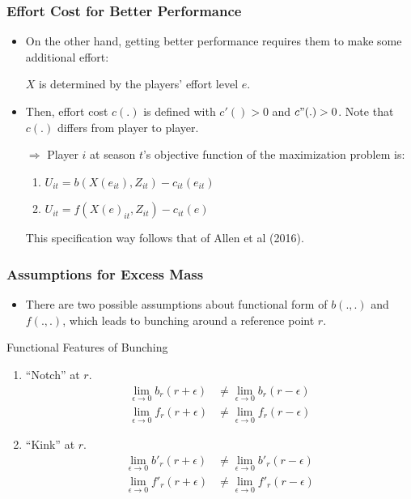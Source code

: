 \documentclass[dvipdfmx,12pt]{beamer}
\begin{document}
\begin{frame}\frametitle{Effort Cost for Better Performance}
  \begin{itemize}
    \item On the other hand, getting better performance requires them to make some additional effort:

    $X$ is determined by the players' effort level $e$.

    \item Then, effort cost $c(.)$ is defined with $c'() > 0$ and $c"(.) >0$. Note that $c(.)$ differs from player to player.

    $\Rightarrow$ Player $i$ at season $t$'s objective function of the maximization problem is:

    \begin{enumerate}
      \item $U_{it} = b(X(e_{it}), Z_{it}) - c_{it}(e_{it})$

      \item $U_{it} = f(X(e)_{it}, Z_{it}) - c_{it}(e)$
    \end{enumerate}

    This specification way follows that of Allen et al (2016).
  \end{itemize}
\end{frame}

\begin{frame}\frametitle{Assumptions for Excess Mass}
  \begin{itemize}
    \item There are two possible assumptions about functional form of $b(.,.)$ and $f(.,.)$, which leads to bunching around a reference point $r$.

  \end{itemize}

  \begin{block}{Functional Features of Bunching}
    \begin{enumerate}
      \footnotesize
      \item ``Notch'' at $r$.
      \begin{align*}
        \lim_{\epsilon \to 0} b_r (r + \epsilon) & \neq
        \lim_{\epsilon \to 0} b_r (r - \epsilon) \\
        \lim_{\epsilon \to 0} f_r (r + \epsilon) & \neq
        \lim_{\epsilon \to 0} f_r (r - \epsilon)
      \end{align*}

      \item ``Kink'' at $r$.
      \begin{align*}
        \lim_{\epsilon \to 0} b'_r (r + \epsilon) & \neq
        \lim_{\epsilon \to 0} b'_r (r - \epsilon) \\
        \lim_{\epsilon \to 0} f'_r (r + \epsilon) & \neq
        \lim_{\epsilon \to 0} f'_r (r - \epsilon)
      \end{align*}
    \end{enumerate}
  \end{block}
\end{frame}
\end{document}
